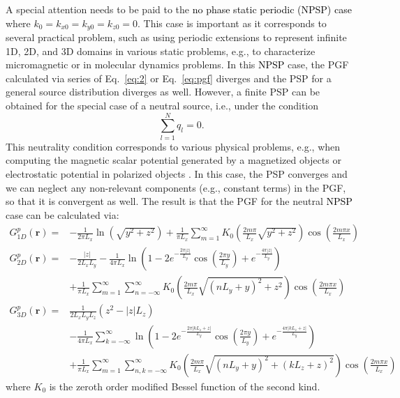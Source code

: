 \documentclass{article}
\begin{document}
A special attention needs to be paid to the \textcolor{black}{no phase static periodic (NPSP) case} where $k_0=k_{x0}=k_{y0}=k_{z0}=0$. This case is important as it corresponds to several practical problem, such as using periodic extensions to represent infinite 1D, 2D, and 3D domains in various static problems, e.g., to characterize micromagnetic \cite{10.1063/1.348954} or in molecular dynamics problems. In this \textcolor{black}{NPSP} case, the PGF calculated via series of Eq.~\eqref{eq:2} or Eq.~\eqref{eq:pgf} diverges and the PSP for a general source distribution diverges as well. However, a finite PSP can be obtained for the special case of a neutral source, i.e., under the condition
\begin{equation}
    \label{eq:neutral}
    \sum_{l=1}^N q_l = 0.
\end{equation}
This neutrality condition corresponds to various physical problems, e.g., when computing the magnetic scalar potential generated by a magnetized objects or electrostatic potential in polarized objects \cite{stohr2006magnetism}. In this case, the PSP converges and we can neglect any non-relevant components (e.g., constant terms) in the PGF, so that it is convergent as well. The result is that the PGF for the neutral \textcolor{black}{NPSP} case can be calculated via:
\begin{subequations} \label{eq:lgf}
    \begin{align}
         G^{p}_{1D}(\mathbf{r})=&-\frac{1}{2\pi L_x}\ln\left(\sqrt{y^2+z^2}\right)+\frac{1}{\pi L_x}\sum_{m=1}^{\infty}K_0\left(\frac{2m\pi}{L_x} \sqrt{y^2+z^2}\right) \cos \left(\frac{2m\pi x}{L_x}\right) \label{eq:lgf_1}\\
         G^{p}_{2D}(\mathbf{r})=&-\frac{|z|}{2L_xL_y} -\frac{1}{4\pi L_x}\ln\left(1-2e^{-\frac{2\pi|z|}{L_y}}\cos \left(\frac{2\pi y}{L_y}\right)+e^{-\frac{4\pi|z|}{L_y}}\right) \nonumber \\
         & +\frac{1}{\pi L_x}\sum_{m=1}^{\infty}\sum_{n=-\infty}^{\infty}K_0\left(\frac{2m\pi}{L_x}\sqrt{(nL_y+y)^2+z^2}\right) \cos \left(\frac{2m\pi x}{L_x}\right) \label{eq:lgf_2}\\
         G^{p}_{3D}(\mathbf{r})=&\frac{1}{2L_xL_yL_z}(z^2-|z|L_z) \nonumber \\
         &-\frac{1}{4\pi L_x}\sum_{k=-\infty}^{\infty}\ln\left(1-2e^{-\frac{2\pi|kL_z+z|}{L_y}}\cos \left(\frac{2\pi y}{L_y}\right)+e^{-\frac{4\pi|kL_z+z|}{L_y}}\right)\nonumber \\
         &+\frac{1}{\pi L_x}\sum_{m=1}^{\infty}\sum_{n,k=-\infty}^{\infty}K_0\left(\frac{2m\pi}{L_x}\sqrt{(nL_y+y)^2+(kL_z+z)^2}\right) \cos \left(\frac{2m\pi x}{L_x}\right) \label{eq:lgf_3}
    \end{align}    
\end{subequations}
where $K_0$ is the zeroth order modified Bessel function of the second kind. 
\end{document}

